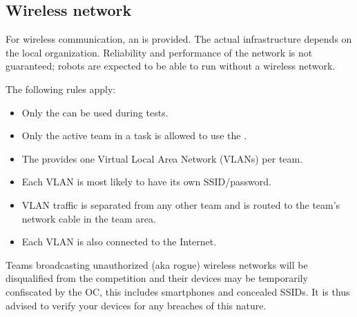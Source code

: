 \subsection{Wireless network}\label{rule:scenario_wifi}

For wireless communication, an \ArenaNetwork{} is provided.
The actual infrastructure depends on the local organization.
Reliability and performance of the network is not guaranteed; robots are expected to be able to run without a wireless network.

The following rules apply:
\begin{itemize}
	\item Only the \ArenaNetwork{} can be used during tests.
	\item Only the active team in a task is allowed to use the \ArenaNetwork.
	\item The \ArenaNetwork{} provides one Virtual Local Area Network (VLANs) per team.
	\item Each VLAN is most likely to have its own SSID/password.
	\item VLAN traffic is separated from any other team and is routed to the team's network cable in the team area.
	\item Each VLAN is also connected to the Internet.
\end{itemize}

Teams broadcasting unauthorized (aka rogue) wireless networks will be disqualified from the competition and their devices may be temporarily confiscated by the OC, this includes smartphones and concealed SSIDs.
It is thus advised to verify your devices for any breaches of this nature.


